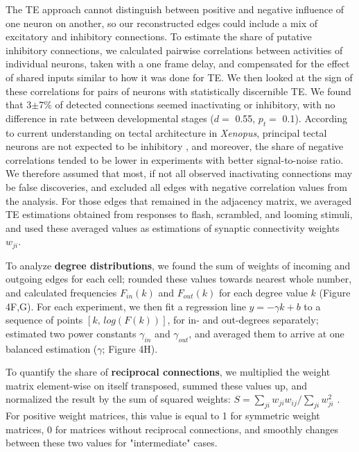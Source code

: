 \documentclass{article}
\begin{document}
The TE approach cannot distinguish between positive and negative influence of one neuron on another, so our reconstructed edges could include a mix of excitatory and inhibitory connections. To estimate the share of putative inhibitory connections, we calculated pairwise correlations between activities of individual neurons, taken with a one frame delay, and compensated for the effect of shared inputs similar to how it was done for TE. We then looked at the sign of these correlations for pairs of neurons with statistically discernible TE. We found that 3$\pm$7\% of detected connections seemed inactivating or inhibitory, with no difference in rate between developmental stages ($d=$ 0.55, $p_t=$ 0.1). According to current understanding on tectal architecture in \textit{Xenopus}, principal tectal neurons are not expected to be inhibitory \citep{bell2011polyamines}, and moreover, the share of negative correlations tended to be lower in experiments with better signal-to-noise ratio. We therefore assumed that most, if not all observed inactivating connections may be false discoveries, and excluded all edges with negative correlation values from the analysis. For those edges that remained in the adjacency matrix, we averaged TE estimations obtained from responses to flash, scrambled, and looming stimuli, and used these averaged values as estimations of synaptic connectivity weights $w_{ji}$.

To analyze \textbf{degree distributions}, we found the sum of weights of incoming and outgoing edges for each cell; rounded these values towards nearest whole number, and calculated frequencies $F_{in}(k)$ and $F_{out}(k)$ for each degree value $k$ (Figure 4F,G). For each experiment, we then fit a regression line $y = -\gamma k + b$ to a sequence of points $[k , \, log(F(k)) ]$, for in- and out-degrees separately; estimated two power constants $\gamma_{in}$ and $\gamma_{out}$, and averaged them to arrive at one balanced estimation ($\gamma$; Figure 4H).

To quantify the share of \textbf{reciprocal connections}, we multiplied the weight matrix element-wise on itself transposed, summed these values up, and normalized the result by the sum of squared weights: $S=\sum_{ji}{w_{ji} w_{ij}} / \sum_{ji}{w_{ji}^2}$ . For positive weight matrices, this value is equal to 1 for symmetric weight matrices, 0 for matrices without reciprocal connections, and smoothly changes between these two values for "intermediate" cases.
\end{document}
